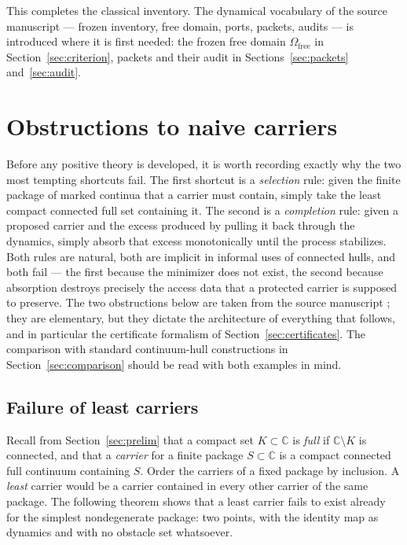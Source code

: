 \documentclass[11pt,reqno]{amsart}
\theoremstyle{definition}
\theoremstyle{remark}
\newcommand{\C}{\mathbb C}
\newcommand{\Omfree}{\Omega_{\mathrm{free}}}
\begin{document}
This completes the classical inventory.  The dynamical vocabulary of the
source manuscript --- frozen inventory, free domain, ports, packets,
audits --- is introduced where it is first needed:
the frozen free domain $\Omfree$ in Section~\ref{sec:criterion}, packets
and their audit in Sections~\ref{sec:packets} and~\ref{sec:audit}.


\section{Obstructions to naive carriers}\label{sec:obstructions}

Before any positive theory is developed, it is worth recording exactly why the
two most tempting shortcuts fail. The first shortcut is a \emph{selection}
rule: given the finite package of marked continua that a carrier must contain,
simply take the least compact connected full set containing it. The second is
a \emph{completion} rule: given a proposed carrier and the excess produced by
pulling it back through the dynamics, simply absorb that excess monotonically
until the process stabilizes. Both rules are natural, both are implicit in
informal uses of connected hulls, and both fail --- the first because the
minimizer does not exist, the second because absorption destroys precisely the
access data that a protected carrier is supposed to preserve. The two
obstructions below are taken from the source manuscript
\cite[Theorem~6.12, Proposition~6.15]{MWman}; they are elementary, but they
dictate the architecture of everything that follows, and in particular the
certificate formalism of Section~\ref{sec:certificates}. The comparison with
standard continuum-hull constructions in Section~\ref{sec:comparison} should
be read with both examples in mind.

\subsection{Failure of least carriers}\label{subsec:B-no-least}

Recall from Section~\ref{sec:prelim} that a compact set $K\subset\C$ is
\emph{full} if $\C\setminus K$ is connected, and that a \emph{carrier} for a
finite package $S\subset\C$ is a compact connected full continuum containing
$S$. Order the carriers of a fixed package by inclusion. A \emph{least}
carrier would be a carrier contained in every other carrier of the same
package. The following theorem shows that a least carrier fails to exist
already for the simplest nondegenerate package: two points, with the identity
map as dynamics and with no obstacle set whatsoever.
\end{document}
